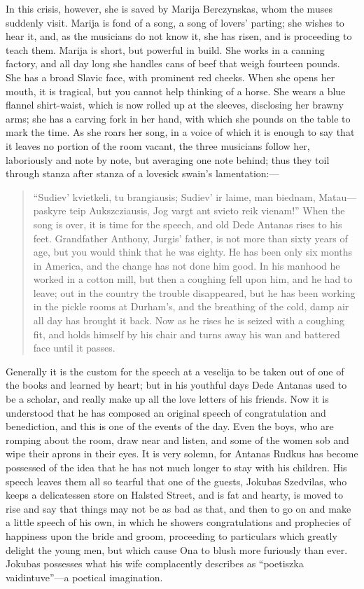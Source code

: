 \documentclass[
]{book}
\theoremstyle{definition}
\theoremstyle{definition}
\theoremstyle{definition}
\theoremstyle{definition}
\theoremstyle{remark}
\begin{document}
In this crisis, however, she is saved by Marija Berczynskas, whom the muses suddenly visit. Marija is fond of a song, a song of lovers' parting; she wishes to hear it, and, as the musicians do not know it, she has risen, and is proceeding to teach them. Marija is short, but powerful in build. She works in a canning factory, and all day long she handles cans of beef that weigh fourteen pounds. She has a broad Slavic face, with prominent red cheeks. When she opens her mouth, it is tragical, but you cannot help thinking of a horse. She wears a blue flannel shirt-waist, which is now rolled up at the sleeves, disclosing her brawny arms; she has a carving fork in her hand, with which she pounds on the table to mark the time. As she roars her song, in a voice of which it is enough to say that it leaves no portion of the room vacant, the three musicians follow her, laboriously and note by note, but averaging one note behind; thus they toil through stanza after stanza of a lovesick swain's lamentation:---

\begin{quote}
``Sudiev' kvietkeli, tu brangiausis;
Sudiev' ir laime, man biednam,
Matau---paskyre teip Aukszcziausis,
Jog vargt ant svieto reik vienam!''
When the song is over, it is time for the speech, and old Dede Antanas rises to his feet. Grandfather Anthony, Jurgis' father, is not more than sixty years of age, but you would think that he was eighty. He has been only six months in America, and the change has not done him good. In his manhood he worked in a cotton mill, but then a coughing fell upon him, and he had to leave; out in the country the trouble disappeared, but he has been working in the pickle rooms at Durham's, and the breathing of the cold, damp air all day has brought it back. Now as he rises he is seized with a coughing fit, and holds himself by his chair and turns away his wan and battered face until it passes.
\end{quote}

Generally it is the custom for the speech at a veselija to be taken out of one of the books and learned by heart; but in his youthful days Dede Antanas used to be a scholar, and really make up all the love letters of his friends. Now it is understood that he has composed an original speech of congratulation and benediction, and this is one of the events of the day. Even the boys, who are romping about the room, draw near and listen, and some of the women sob and wipe their aprons in their eyes. It is very solemn, for Antanas Rudkus has become possessed of the idea that he has not much longer to stay with his children. His speech leaves them all so tearful that one of the guests, Jokubas Szedvilas, who keeps a delicatessen store on Halsted Street, and is fat and hearty, is moved to rise and say that things may not be as bad as that, and then to go on and make a little speech of his own, in which he showers congratulations and prophecies of happiness upon the bride and groom, proceeding to particulars which greatly delight the young men, but which cause Ona to blush more furiously than ever. Jokubas possesses what his wife complacently describes as ``poetiszka vaidintuve''---a poetical imagination.
\end{document}
